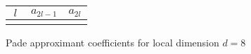 \documentclass[11pt, oneside]{article}
\begin{document}
\newcommand{\dval}{8}    %
\newcommand{\ORDval}{32} %

\begin{center}
\renewcommand{\arraystretch}{1.2}
\begin{tabular}{|c|| c| c |} 
 \hline
  $\ l \ $ & $a_{2l-1}$ & $a_{2l}$  \\ [0.5ex] 
 \hline
%
\\[0.3ex]
 \hline
\end{tabular}

\bigskip

Pade approximant coefficients for local dimension $d = \dval$
\end{center}
\end{document}
